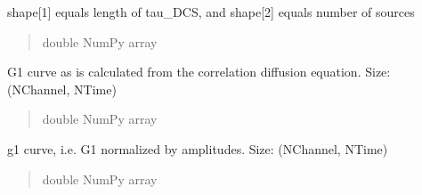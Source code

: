 \documentclass[letterpaper,10pt,english]{sphinxmanual}
\begin{document}
\begin{fulllineitems}
\begin{fulllineitems}
\sphinxAtStartPar
shape{[}\sphinxhyphen{}1{]} equals length of tau\_DCS, and shape{[}\sphinxhyphen{}2{]} equals number of sources
\begin{quote}\begin{description}
\sphinxAtStartPar
double NumPy array

\end{description}\end{quote}

\end{fulllineitems}


\begin{fulllineitems}
\label{\detokenize{_autosummary/nirfasterff.base.data.DCSdata:nirfasterff.base.data.DCSdata.G1_DCS}}
\pysigstartsignatures
{}
\pysigstopsignatures
\sphinxAtStartPar
G1 curve as is calculated from the correlation diffusion equation. Size: (NChannel, NTime)
\begin{quote}\begin{description}
\sphinxAtStartPar
double NumPy array

\end{description}\end{quote}

\end{fulllineitems}


\begin{fulllineitems}
\label{\detokenize{_autosummary/nirfasterff.base.data.DCSdata:nirfasterff.base.data.DCSdata.g1_DCS}}
\pysigstartsignatures
{}
\pysigstopsignatures
\sphinxAtStartPar
g1 curve, i.e. G1 normalized by amplitudes. Size: (NChannel, NTime)
\begin{quote}\begin{description}
\sphinxAtStartPar
double NumPy array

\end{description}\end{quote}

\end{fulllineitems}



\end{fulllineitems}
\end{document}
